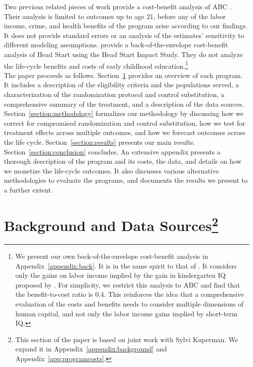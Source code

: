 \noindent Two previous related pieces of work provide a cost-benefit analysis of ABC \citep{Masse_Barnett_2002_BOOKBenefitCostAnalysis,Barnett_Masse_2007_EER}. Their analysis is limited to outcomes up to age 21, before any of the labor income, crime, and health benefits of the program arise according to our findings. It does not provide standard errors or an analysis of the estimates' sensitivity to different modeling assumptions. \citet{Kline-Walters_2015_NBER-Evaluating} provide a back-of-the-envelope cost-benefit analysis of Head Start using the Head Start Impact Study. They do not analyze the life-cycle benefits and costs of early childhood education.\footnote{We present our own back-of-the-envelope cost-benefit analysis in Appendix~\ref{appendix:back}. It is in the same spirit to that of \citet{
Kline-Walters_2015_NBER-Evaluating}. It considers only the gains on labor income implied by the gain in kindergarten IQ proposed by \citet{
Chetty_Friedman_etal_2011_QJoE}. For simplicity, we restrict this analysis to ABC and find that the benefit-to-cost ratio is $0.4$. This reinforces the idea that a comprehensive evaluation of the costs and benefits needs to consider multiple dimensions of human capital, and not only the labor income gains implied by short-term IQ.} \\ 

\noindent The paper proceeds as follows. Section~\ref{section:background}  provides an overview of each program. It includes a description of the eligibility criteria and the populations served, a characterization of the randomization protocol and control substitution, a comprehensive summary of the treatment, and a description of the data sources. Section~\ref{section:methodology} formalizes our methodology by discussing how we correct for compromised randomization and control substitution, how we test for treatment effects across multiple outcomes, and how we forecast outcomes across the life cycle. Section~\ref{section:results} presents our main results. Section~\ref{section:conclusion} concludes. An extensive appendix presents a thorough description of the program and its costs, the data, and details on how we monetize the life-cycle outcomes. It also discusses various alternative methodologies to evaluate the programs, and documents the results we present to a further extent.

\section[Background and Data Sources]{Background and Data Sources\footnote{This section of the paper is based on joint work with Sylvi Kuperman. We expand it  in Appendix~\ref{appendix:background} and Appendix~\ref{app:programcosts}.}} \label{section:background}

